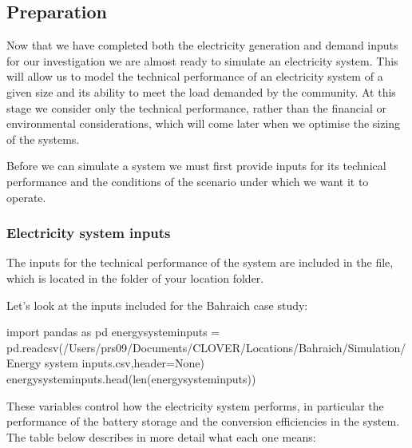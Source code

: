 \documentclass[letterpaper,10pt,english]{sphinxmanual}
\begin{document}
\subsection{Preparation}
\label{\detokenize{energy_system_simulation:preparation}}
\sphinxAtStartPar
Now that we have completed both the electricity
generation and demand inputs for our investigation we are almost
ready to simulate an electricity system. This will allow us to model the
technical performance of an electricity system of a given size and its
ability to meet the load demanded by the community. At this stage we
consider only the technical performance, rather than the financial or
environmental considerations, which will come later when we optimise
the sizing of the systems.

\sphinxAtStartPar
Before we can simulate a system we must first provide inputs for its
technical performance and the conditions of the scenario under which we
want it to operate.


\subsubsection{Electricity system inputs}
\label{\detokenize{energy_system_simulation:electricity-system-inputs}}
\sphinxAtStartPar
The inputs for the technical performance of the system are included in
the  file, which is located in the 
folder of your location folder.

\sphinxAtStartPar
Let’s look at the inputs included for the Bahraich case study:

\begin{sphinxVerbatim}[commandchars=\\\{\}]
import pandas as pd
energy\PYGZus{}system\PYGZus{}inputs = pd.read\PYGZus{}csv(\PYGZdq{}/Users/prs09/Documents/CLOVER/Locations/Bahraich/Simulation/Energy system inputs.csv\PYGZdq{},header=None)
energy\PYGZus{}system\PYGZus{}inputs.head(len(energy\PYGZus{}system\PYGZus{}inputs))
\end{sphinxVerbatim}



\begin{DUlineblock}{0em}
\item[] 
\end{DUlineblock}

\sphinxAtStartPar
These variables control how the electricity system performs, in
particular the performance of the battery storage and the conversion
efficiencies in the system. The table below describes in more detail
what each one means:
\end{document}
